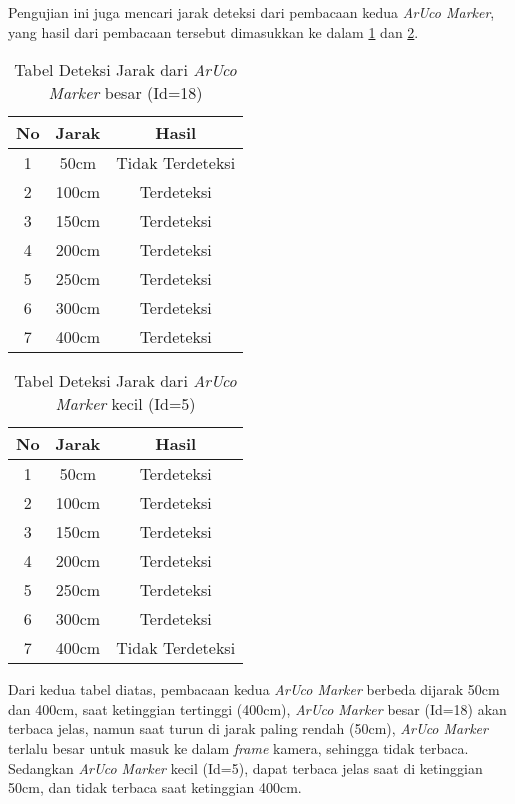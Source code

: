 \begin{packed_item}
	Pengujian ini juga mencari jarak deteksi dari pembacaan kedua \textit{ArUco Marker}, yang hasil dari pembacaan tersebut dimasukkan ke dalam \cref{tab:deteksiaruco18} dan \cref{tab:deteksiaruco5}.
	
	\begin{table}[H]
		\caption{Tabel Deteksi Jarak dari \textit{ArUco Marker} besar (Id=18)}
		\label{tab:deteksiaruco18}
		\centering
		\begin{tabular}{|c|c|c|}
			\hline
			\textbf{No} & \textbf{Jarak} & \textbf{Hasil}            \\ \hline
			1  & 50cm  & Tidak Terdeteksi \\ \hline
			2  & 100cm & Terdeteksi       \\ \hline
			3  & 150cm & Terdeteksi       \\ \hline
			4  & 200cm & Terdeteksi       \\ \hline
			5  & 250cm & Terdeteksi       \\ \hline
			6  & 300cm & Terdeteksi       \\ \hline
			7  & 400cm & Terdeteksi       \\ \hline
		\end{tabular}
	\end{table}
	
	
	\begin{table}[H]
		\caption{Tabel Deteksi Jarak dari \textit{ArUco Marker} kecil (Id=5)}
		\label{tab:deteksiaruco5}
		\centering
		\begin{tabular}{|c|c|c|}
			\hline
			\textbf{No} & \textbf{Jarak} & \textbf{Hasil}            \\ \hline
			1  & 50cm  & Terdeteksi       \\ \hline
			2  & 100cm & Terdeteksi       \\ \hline
			3  & 150cm & Terdeteksi       \\ \hline
			4  & 200cm & Terdeteksi       \\ \hline
			5  & 250cm & Terdeteksi       \\ \hline
			6  & 300cm & Terdeteksi       \\ \hline
			7  & 400cm & Tidak Terdeteksi \\ \hline
		\end{tabular}
	\end{table}
	
	Dari kedua tabel diatas, pembacaan kedua \textit{ArUco Marker} berbeda dijarak 50cm dan 400cm, saat ketinggian tertinggi (400cm), \textit{ArUco Marker} besar (Id=18) akan terbaca jelas, namun saat turun di jarak paling rendah (50cm), \textit{ArUco Marker} terlalu besar untuk masuk ke dalam \textit{frame} kamera, sehingga tidak terbaca. Sedangkan \textit{ArUco Marker} kecil (Id=5), dapat terbaca jelas saat di ketinggian 50cm, dan tidak terbaca saat ketinggian 400cm.
\end{packed_item}

